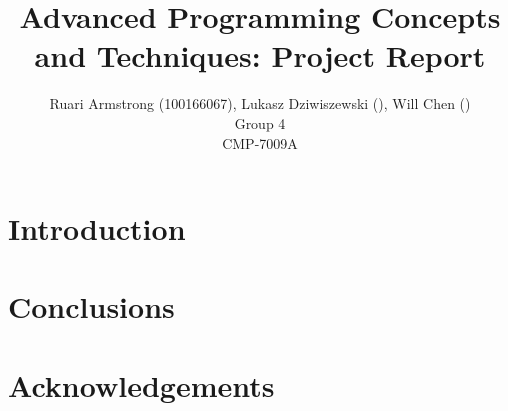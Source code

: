 \documentclass{ueacmpstyle}
\begin{document}
\title{Advanced Programming Concepts and Techniques: Project Report}

\author{
Ruari Armstrong (100166067), Lukasz Dziwiszewski (), Will Chen ()\\
Group 4 \\
CMP-7009A
}

\maketitle

\begin{abstract} \label{abstract}

\end{abstract}


\section{Introduction} \label{intro}

\section{Conclusions} \label{conclusions}

\section*{Acknowledgements} \label{acknowledgments}




  
\end{document}
